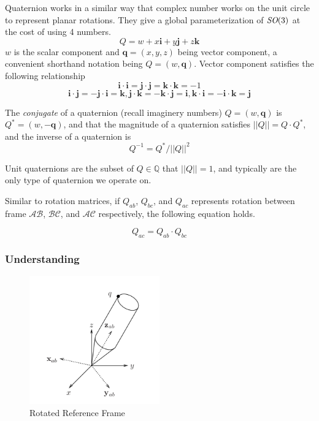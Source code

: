 \documentclass[letterpaper]{article}
\begin{document}
Quaternion works in a similar way that complex number works on the unit circle to represent planar rotations. They 
give a global parameterization of $\emph{SO}(3)$ at the cost of using 4 numbers. 
$$Q = w + x\mathbf{i} + y\mathbf{j} + z\mathbf{k}$$
$w$ is the scalar component and $\mathbf{q} = (x, y, z)$ being vector component, a convenient shorthand notation being
$Q = (w, \mathbf{q})$. Vector component satisfies the following relationship
$$\mathbf{i} \cdot \mathbf{i} = \mathbf{j} \cdot \mathbf{j} = \mathbf{k} \cdot \mathbf{k} = -1$$
$$\mathbf{i} \cdot \mathbf{j} = -\mathbf{j} \cdot \mathbf{i} = \mathbf{k}, 
\mathbf{j} \cdot \mathbf{k} = -\mathbf{k} \cdot \mathbf{j} = \mathbf{i},
\mathbf{k} \cdot \mathbf{i} = -\mathbf{i} \cdot \mathbf{k} = \mathbf{j}$$

The \emph{conjugate} of a quaternion (recall imaginery numbers) $Q = (w, \mathbf{q})$ is $Q^{*} = (w, -\mathbf{q})$,
and that the magnitude of a quaternion satisfies $||Q|| = Q \cdot Q^{*}$, and the inverse of a quaternion is 
$$Q^{-1} = Q^{*} / ||Q||^{2}$$

Unit quaternions are the subset of $Q \in \mathbb{Q}$ that $||Q|| = 1$, and typically are the only type of quaternion 
we operate on. 

Similar to rotation matrices, if $Q_{ab}$, $Q_{bc}$, and $Q_{ac}$ represents rotation between frame $\mathcal{AB}$,
$\mathcal{BC}$, and $\mathcal{AC}$ respectively, the following equation holds.

$$Q_{ac} = Q_{ab} \cdot Q_{bc}$$

\subsubsection{Understanding} \label{sec:so}

\begin{figure}
  \centering
  \includegraphics[width=0.5\textwidth]{figs/rot-under.png}
  \caption{Rotated Reference Frame} \label{fig:rot_showing}
\end{figure}
\end{document}
